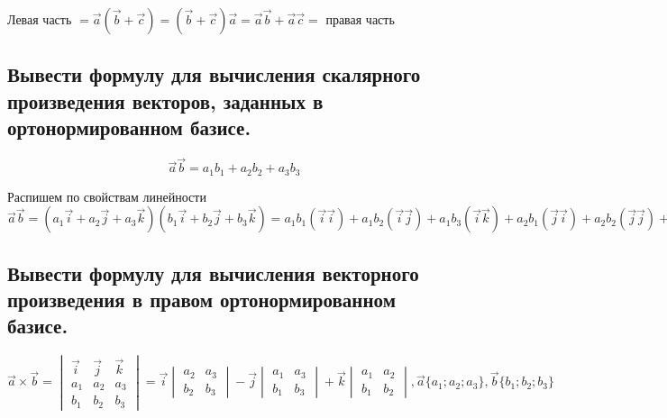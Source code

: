 \documentclass[a4paper, 10pt]{article}
\renewcommand{\a}{\vec{a}}
\renewcommand{\b}{\vec{b}}
\renewcommand{\c}{\vec{c}}
\renewcommand{\i}{\vec{i}}
\renewcommand{\j}{\vec{j}}
\renewcommand{\k}{\vec{k}}
\begin{document}
Левая часть $ = \a(\b + \c) = (\b + \c)\a = 
\a\b + \a\c = $ правая часть

\subsection{Вывести формулу для вычисления скалярного произведения векторов, заданных в ортонормированном базисе.}

$$\a\b = a_1b_1 + a_2b_2 + a_3b_3$$

Распишем по свойствам линейности $\a\b = (a_1\i + a_2\j + a_3\k)(b_1\i + b_2\j + b_3\k) = 
a_1b_1(\i\i) + a_1b_2(\i\j) + a_1b_3(\i\k) + a_2b_1(\j\i) + a_2b_2(\j\j) +a_2b_3(\j\k)+
a_3b_1(\k\i) + a_3b_2(\k\j) + a_3b_3(\k\k) = |\i\i=1,\i\j=0,\i\k=0,\j\j=1,\j\k=0,\k\k=0| = a_1b_1 + a_2b_2 + a_3b_3$

\subsection{Вывести формулу для вычисления векторного произведения в правом ортонормированном базисе.}

\begin{center}
$\a \times \b = 
\begin{vmatrix}
    \i&\j&\k\\
    a_1 & a_2 & a_3\\
    b_1 & b_2 & b_3
\end{vmatrix} = \i
\begin{vmatrix}
    a_2 & a_3\\
    b_2 & b_3
\end{vmatrix} - \j
\begin{vmatrix}
    a_1 & a_3\\
    b_1 & b_3
\end{vmatrix} + \k
\begin{vmatrix}
    a_1 & a_2\\
    b_1 & b_2
\end{vmatrix}, \a\{a_1;a_2;a_3\},\b\{b_1;b_2;b_3\}$
\end{center}
\end{document}

